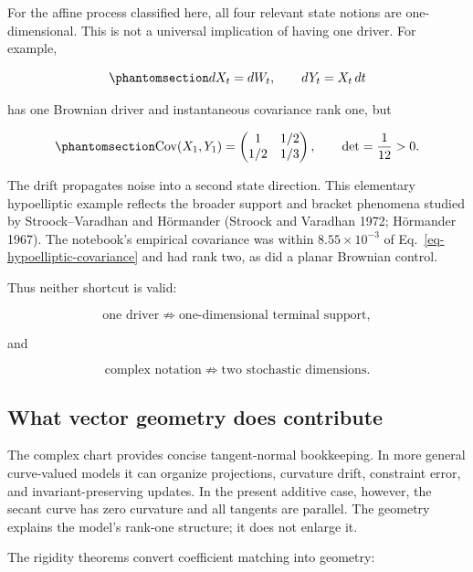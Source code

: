\documentclass[
  english,
  10pt,
  letterpaper,
  DIV=11,
  numbers=noendperiod]{scrartcl}
\theoremstyle{definition}
\theoremstyle{plain}
\theoremstyle{plain}
\theoremstyle{remark}
\begin{document}
For the affine process classified here, all four relevant state notions
are one-dimensional. This is not a universal implication of having one
driver. For example,

\begin{equation}\protect\phantomsection\label{eq-integrated-brownian}{
dX_t=dW_t,\qquad dY_t=X_t\,dt
}\end{equation}

has one Brownian driver and instantaneous covariance rank one, but

\begin{equation}\protect\phantomsection\label{eq-hypoelliptic-covariance}{
\operatorname{Cov}(X_1,Y_1)
=
\begin{pmatrix}
1&1/2\\
1/2&1/3
\end{pmatrix},
\qquad
\det=\frac1{12}>0.
}\end{equation}

The drift propagates noise into a second state direction. This
elementary hypoelliptic example reflects the broader support and bracket
phenomena studied by Stroock--Varadhan and Hörmander (Stroock and
Varadhan 1972; Hörmander 1967). The notebook's empirical covariance was
within \(8.55\times10^{-3}\) of Eq.~\ref{eq-hypoelliptic-covariance} and
had rank two, as did a planar Brownian control.

Thus neither shortcut is valid:

\[
\text{one driver}\not\Rightarrow
\text{one-dimensional terminal support},
\]

and

\[
\text{complex notation}\not\Rightarrow
\text{two stochastic dimensions}.
\]

\subsection{What vector geometry does
contribute}\label{what-vector-geometry-does-contribute}

The complex chart provides concise tangent-normal bookkeeping. In more
general curve-valued models it can organize projections, curvature
drift, constraint error, and invariant-preserving updates. In the
present additive case, however, the secant curve has zero curvature and
all tangents are parallel. The geometry explains the model's rank-one
structure; it does not enlarge it.

The rigidity theorems convert coefficient matching into geometry:
\end{document}
